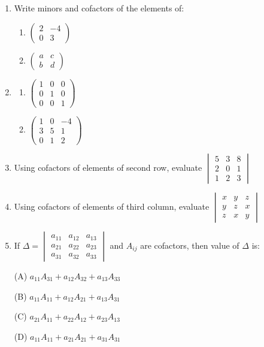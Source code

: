 \documentclass{article}
\begin{document}
\begin{enumerate}[label=\textbf{\arabic*.}, leftmargin=*, itemsep=0.8em]

\item Write minors and cofactors of the elements of:
\begin{enumerate}
\item $\begin{pmatrix} 2 & -4 \\ 0 & 3 \end{pmatrix}$
\item $\begin{pmatrix} a & c \\ b & d \end{pmatrix}$
\end{enumerate}

\item
\begin{enumerate}
\item $\begin{pmatrix} 1&0&0\\0&1&0\\0&0&1 \end{pmatrix}$
\item $\begin{pmatrix} 1&0&-4\\3&5&1\\0&1&2 \end{pmatrix}$
\end{enumerate}

\item Using cofactors of elements of second row, evaluate  
$ \begin{vmatrix} 5&3&8\\2&0&1\\1&2&3 \end{vmatrix} $

\item Using cofactors of elements of third column, evaluate  
$ \begin{vmatrix} x&y&z\\ y&z&x\\ z&x&y \end{vmatrix} $

\item If $\Delta =
\begin{vmatrix}
a_{11}&a_{12}&a_{13}\\
a_{21}&a_{22}&a_{23}\\
a_{31}&a_{32}&a_{33}
\end{vmatrix}$ and $A_{ij}$ are cofactors, then value of $\Delta$ is:

(A) $a_{11}A_{31}+a_{12}A_{32}+a_{13}A_{33}$

(B) $a_{11}A_{11}+a_{12}A_{21}+a_{13}A_{31}$

(C) $a_{21}A_{11}+a_{22}A_{12}+a_{23}A_{13}$

(D) $a_{11}A_{11}+a_{21}A_{21}+a_{31}A_{31}$

\end{enumerate}
\end{document}
